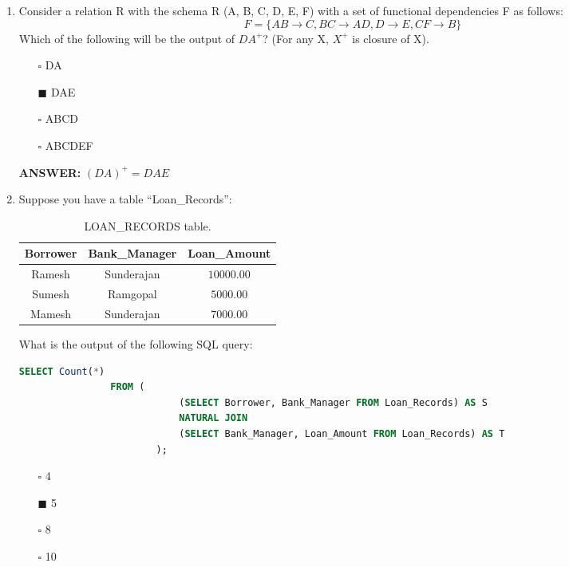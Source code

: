 \documentclass[10pt]{article}
\newcommand{\lightrule}{%
	\arrayrulecolor{black!30}%
	\midrule[\lightrulewidth]%
	\arrayrulecolor{black}}
\begin{document}
\begin{enumerate}
		\item Consider a relation R with the schema R (A, B, C, D, E, F) with a set of functional dependencies F as follows: $$F = \{AB \rightarrow C, BC \rightarrow AD, D \rightarrow E, CF \rightarrow B\}$$
		Which of the following will be the output of $DA^+$? (For any X, $X^+$ is closure of X).
			\begin{enumerate}
				\item[$\square$] DA
				\item[$\blacksquare$] DAE
				\item[$\square$] ABCD
				\item[$\square$] ABCDEF
			\end{enumerate}
			\color{red} \textbf{ANSWER:} \color{black} $(DA)^+ =  DAE$

		\newpage

		\item Suppose you have a table “Loan\_Records”:
			\begin{table}[H]
				\centering
				\begin{tabular}{@{} *{3}{c} @{}}
					\toprule
						\textbf{Borrower} & \textbf{Bank\_Manager} & \textbf{Loan\_Amount} \\
					\midrule
						Ramesh & Sunderajan & $10000.00$ \\ 
					\lightrule
						Sumesh & Ramgopal & $5000.00$ \\ 
					\lightrule
						Mamesh & Sunderajan & $7000.00$ \\ 
					\bottomrule
				\end{tabular}
				\caption{LOAN\_RECORDS table.}
			\end{table}

			What is the output of the following SQL query: 
			\begin{lstlisting}[language=SQL,firstline=1, lastline=6] 
				SELECT Count(*) 
				FROM (
							(SELECT Borrower, Bank_Manager FROM Loan_Records) AS S 
							NATURAL JOIN 
							(SELECT Bank_Manager, Loan_Amount FROM Loan_Records) AS T
						);
			\end{lstlisting}

			\begin{enumerate}
				\item[$\square$] 4
				\item[$\blacksquare$] 5
				\item[$\square$] 8
				\item[$\square$] 10
			\end{enumerate}


\end{enumerate}
\end{document}
